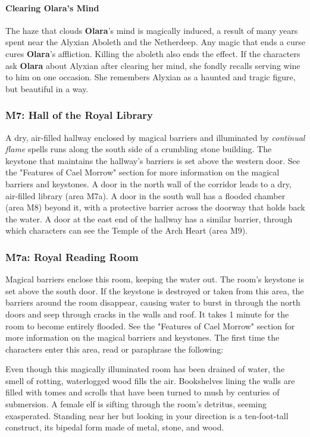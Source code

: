 \documentclass[10pt,a4,twoside,twocolumn,openany,nodeprecatedcode]{dndbook}
\begin{document}
\paragraph{Clearing Olara's Mind}
The haze that clouds \textbf{Olara}'s mind is magically induced, a result of many years spent near the Alyxian Aboleth and the Netherdeep. Any magic that ends a curse cures \textbf{Olara}'s affliction. Killing the aboleth also ends the effect.
If the characters ask \textbf{Olara} about Alyxian after clearing her mind, she fondly recalls serving wine to him on one occasion. She remembers Alyxian as a haunted and tragic figure, but beautiful in a way.
\subsubsection{M7: Hall of the Royal Library}
A dry, air-filled hallway enclosed by magical barriers and illuminated by \textit{continual flame} spells runs along the south side of a crumbling stone building. The keystone that maintains the hallway's barriers is set above the western door. See the "Features of Cael Morrow" section for more information on the magical barriers and keystones.
A door in the north wall of the corridor leads to a dry, air-filled library (area M7a). A door in the south wall has a flooded chamber (area M8) beyond it, with a protective barrier across the doorway that holds back the water. A door at the east end of the hallway has a similar barrier, through which characters can see the Temple of the Arch Heart (area M9).
\subsubsection{M7a: Royal Reading Room}
Magical barriers enclose this room, keeping the water out. The room's keystone is set above the south door. If the keystone is destroyed or taken from this area, the barriers around the room disappear, causing water to burst in through the north doors and seep through cracks in the walls and roof. It takes 1 minute for the room to become entirely flooded. See the "Features of Cael Morrow" section for more information on the magical barriers and keystones.
The first time the characters enter this area, read or paraphrase the following:
\begin{DndReadAloud}{}
Even though this magically illuminated room has been drained of water, the smell of rotting, waterlogged wood fills the air. Bookshelves lining the walls are filled with tomes and scrolls that have been turned to mush by centuries of submersion.
A female elf is sifting through the room's detritus, seeming exasperated. Standing near her but looking in your direction is a ten-foot-tall construct, its bipedal form made of metal, stone, and wood.
\end{DndReadAloud}
\end{document}
